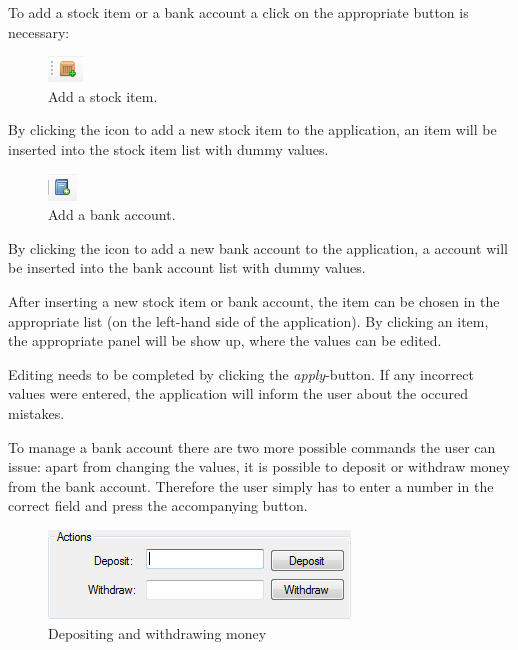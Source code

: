 To add a stock item or a bank account a click on the appropriate button is necessary:
 
\begin{figure} %
\centering
\includegraphics[scale=1]{gfx/add_stock_item.png}
\caption{Add a stock item.}
\label{fig:add_si}
\end{figure}

By clicking the icon to add a new stock item to the application, an item will be inserted into the stock item list with dummy values.

\begin{figure} %
\centering
\includegraphics[scale=1]{gfx/add_bank_account.png}
\caption{Add a bank account.}
\label{fig:add_ba}
\end{figure}

By clicking the icon to add a new bank account to the application, a account will be inserted into the bank account list with dummy values.

After inserting a new stock item or bank account, the item can be chosen in the appropriate list (on the left-hand side of the application). By clicking an item, the appropriate panel will be show up, where the values can be edited.

Editing needs to be completed by clicking the \textit{apply}-button. If any incorrect values were entered, the application will inform the user about the occured mistakes.

To manage a bank account there are two more possible commands the user can issue: apart from changing the values, it is possible to deposit or withdraw money from the bank account. Therefore the user simply has to enter a number in the correct field and press the accompanying button.

\begin{figure}[H]
\begin{center}
\includegraphics[scale=1.0]{gfx/bank_account_actions.png}
\caption{Depositing and withdrawing money}
\label{fig:ba_actions}
\end{center}
\end{figure}

